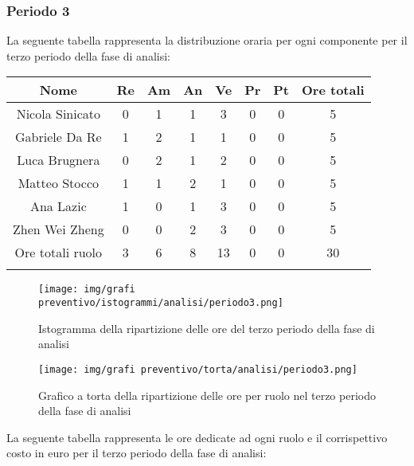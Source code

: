 %
\newpage
\subsubsection{Periodo 3}
%
La seguente tabella rappresenta la distribuzione oraria per ogni componente per il terzo periodo della fase di analisi:

	\setlength\extrarowheight{5pt}
	\begin{tabularx}{\textwidth}{|ccccccc|c|}
		\hline
		\rowcolor{white}
		\textbf{Nome} & \textbf{Re} & \textbf{Am} & \textbf{An} & \textbf{Ve} & \textbf{Pr}& \textbf{Pt} & \textbf{Ore totali} \\
		\hline
		Nicola Sinicato &0&1&1&3&0&0&5 \\
		Gabriele Da Re &1&2&1&1&0&0&5 \\
		Luca Brugnera &0&2&1&2&0&0&5 \\
		Matteo Stocco &1&1&2&1&0&0&5 \\
		Ana Lazic &1&0&1&3&0&0&5 \\
		Zhen Wei Zheng &0&0&2&3&0&0&5 \\
		\hline
		Ore totali ruolo &3&6&8&13&0&0&30 \\
		\hline
		\rowcolor{white}
		\caption{Distribuzione oraria durante il terzo periodo di analisi per ruolo e persona}
	\end{tabularx}
	\vspace{10pt}
	
\begin{figure}[H]
    \centering
    \texttt{[image: img/grafi preventivo/istogrammi/analisi/periodo3.png]}
    \caption{Istogramma della ripartizione delle ore del terzo periodo della fase di analisi}
\end{figure}
\begin{figure}[H]
    \centering
    \texttt{[image: img/grafi preventivo/torta/analisi/periodo3.png]}
    \caption{Grafico a torta della ripartizione delle ore per ruolo nel terzo periodo della fase di analisi}
\end{figure}
La seguente tabella rappresenta le ore dedicate ad ogni ruolo e il corrispettivo costo in euro per il terzo periodo della fase di analisi:

